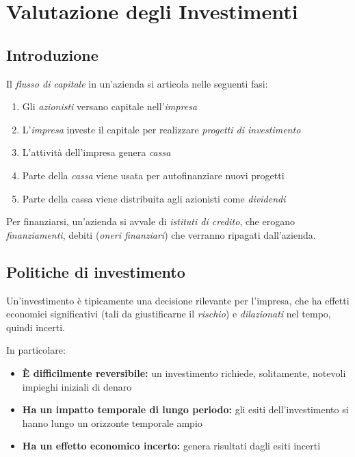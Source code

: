\chapter{Valutazione degli Investimenti}

\section{Introduzione}
Il \emph{flusso di capitale} in un'azienda si articola nelle seguenti fasi:
\begin{enumerate}
    \item Gli \emph{azionisti} versano capitale nell'\emph{impresa}
    \item L'\emph{impresa} investe il capitale per realizzare \emph{progetti di investimento}
    \item L'attività dell'impresa genera \emph{cassa}
    \item Parte della \emph{cassa} viene usata per autofinanziare nuovi progetti
    \item Parte della cassa viene distribuita agli azionisti come \emph{dividendi}
\end{enumerate}

Per finanziarsi, un'azienda si avvale di \emph{istituti di credito}, che erogano
\emph{finanziamenti}, debiti (\emph{oneri finanziari}) che verranno ripagati dall'azienda.

\section{Politiche di investimento}
Un'\gls{investimento} è  tipicamente una decisione rilevante per l’impresa, che
ha effetti economici significativi (tali da giustificarne il \emph{rischio}) e
\emph{dilazionati} nel tempo, quindi incerti.

In particolare:
\begin{itemize}
    \item \textbf{È difficilmente reversibile:} un investimento richiede, solitamente, notevoli impieghi iniziali di denaro
    \item \textbf{Ha un impatto temporale di lungo periodo:} gli esiti dell’investimento si hanno lungo un orizzonte temporale ampio
    \item \textbf{Ha un effetto economico incerto:} genera risultati dagli esiti incerti
\end{itemize}

